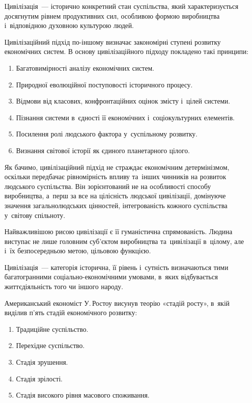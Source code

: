 \documentclass[a5paper,oneside,DIV=12,12pt,headings=small]{scrartcl}
\begin{document}
		Цивілізація~— історично конкретний стан суспільства, який характеризується досягнутим рівнем продуктивних сил, особливою формою виробництва і~відповідною духовною культурою людей.

		Цивілізаційний підхід по-іншому визначає закономірні ступені розвитку економічних систем. В основу цивілізаційного підходу покладено такі принципи:
		\begin{enumerate}
			\item Багатовимірності аналізу економічних систем.
			\item Природної еволюційної поступовості історичного процесу. 
			\item Відмови від класових, конфронтаційних оцінок змісту і~цілей системи.
			\item Пізнання системи в~єдності її економічних і~соціокультурних елементів.
			\item Посилення ролі людського фактора у~суспільному розвитку.
			\item Визнання світової історії як єдиного планетарного цілого.
		\end{enumerate}

		Як бачимо, цивілізаційний підхід не страждає економічним детермінізмом, оскільки передбачає рівномірність впливу та~інших чинників на розвиток людського суспільства. Він зорієнтований не на особливості способу виробництва, а~перш за все на цілісність людської цивілізації, домінуюче значення загальнолюдських цінностей, інтегрованість кожного суспільства у~світову спільноту.

		Найважливішою рисою цивілізації є її гуманістична спрямованість. Людина виступає не лише головним суб'\-єктом виробництва та~цивілізації в~цілому, але і~їх безпосередньою метою, цільовою функцією.

		Цивілізація~— категорія історична, її рівень і~сутність визначаються тими багатогранними со\-ці\-аль\-но-еко\-но\-міч\-ни\-ми умовами, в~яких відбувається життєдіяльність того чи іншого народу.

		Американський економіст У.\,Ростоу висунув теорію «стадій росту», в~якій виділив п'ять стадій економічного розвитку:
		\begin{enumerate}
			\item Традиційне суспільство.
			\item Перехідне суспільство.
			\item Стадія зрушення.
			\item Стадія зрілості.
			\item Стадія високого рівня масового споживання.
		\end{enumerate}
\end{document}
